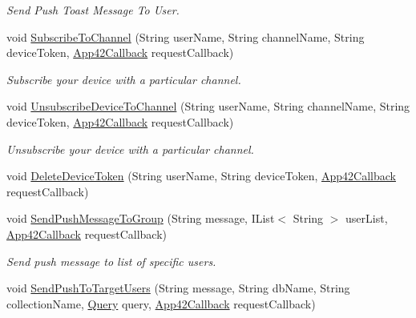 \begin{DoxyCompactItemize}
\begin{DoxyCompactList}\small\item\em Send Push Toast Message To User. \end{DoxyCompactList}\item 
void \hyperlink{classcom_1_1shephertz_1_1app42_1_1paas_1_1sdk_1_1windows_1_1push_1_1_push_notification_service_a4f7ece6e7fde41005d48fe16a8c0af6a}{Subscribe\+To\+Channel} (String user\+Name, String channel\+Name, String device\+Token, \hyperlink{interfacecom_1_1shephertz_1_1app42_1_1paas_1_1sdk_1_1windows_1_1_app42_callback}{App42\+Callback} request\+Callback)
\begin{DoxyCompactList}\small\item\em Subscribe your device with a particular channel. \end{DoxyCompactList}\item 
void \hyperlink{classcom_1_1shephertz_1_1app42_1_1paas_1_1sdk_1_1windows_1_1push_1_1_push_notification_service_a56fb515c1a79e28240b7f8c42b83c36d}{Unsubscribe\+Device\+To\+Channel} (String user\+Name, String channel\+Name, String device\+Token, \hyperlink{interfacecom_1_1shephertz_1_1app42_1_1paas_1_1sdk_1_1windows_1_1_app42_callback}{App42\+Callback} request\+Callback)
\begin{DoxyCompactList}\small\item\em Unsubscribe your device with a particular channel. \end{DoxyCompactList}\item 
void \hyperlink{classcom_1_1shephertz_1_1app42_1_1paas_1_1sdk_1_1windows_1_1push_1_1_push_notification_service_a751872e480c43b330fc518215d8a9d62}{Delete\+Device\+Token} (String user\+Name, String device\+Token, \hyperlink{interfacecom_1_1shephertz_1_1app42_1_1paas_1_1sdk_1_1windows_1_1_app42_callback}{App42\+Callback} request\+Callback)
\item 
void \hyperlink{classcom_1_1shephertz_1_1app42_1_1paas_1_1sdk_1_1windows_1_1push_1_1_push_notification_service_acc713a5e8625073c1efee89a92d46ec1}{Send\+Push\+Message\+To\+Group} (String message, I\+List$<$ String $>$ user\+List, \hyperlink{interfacecom_1_1shephertz_1_1app42_1_1paas_1_1sdk_1_1windows_1_1_app42_callback}{App42\+Callback} request\+Callback)
\begin{DoxyCompactList}\small\item\em Send push message to list of specific users. \end{DoxyCompactList}\item 
void \hyperlink{classcom_1_1shephertz_1_1app42_1_1paas_1_1sdk_1_1windows_1_1push_1_1_push_notification_service_a8aea29bb55babeb784a76da2c744eaa2}{Send\+Push\+To\+Target\+Users} (String message, String db\+Name, String collection\+Name, \hyperlink{classcom_1_1shephertz_1_1app42_1_1paas_1_1sdk_1_1windows_1_1storage_1_1_query}{Query} query, \hyperlink{interfacecom_1_1shephertz_1_1app42_1_1paas_1_1sdk_1_1windows_1_1_app42_callback}{App42\+Callback} request\+Callback)

\end{DoxyCompactItemize}
